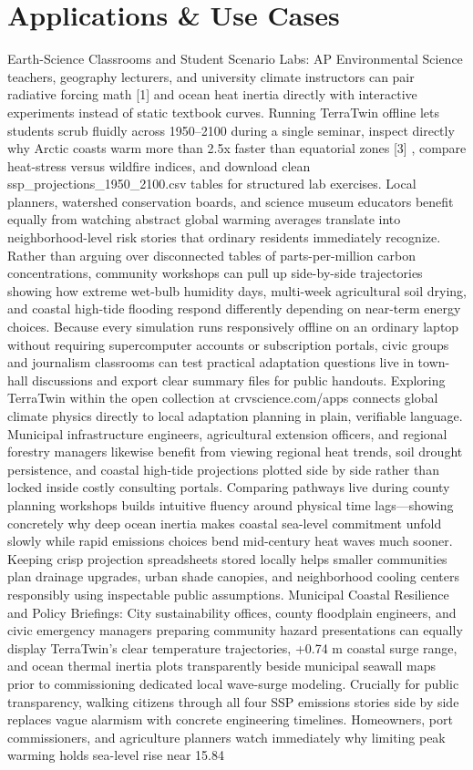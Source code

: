 \documentclass[10pt,letterpaper]{article}
\begin{document}
\section{Applications \& Use Cases}
Earth-Science Classrooms and Student Scenario Labs: AP Environmental Science teachers, geography lecturers, and university climate instructors can pair radiative forcing math [1] and ocean heat inertia directly with interactive experiments instead of static textbook curves. Running TerraTwin offline lets students scrub fluidly across 1950--2100 during a single seminar, inspect directly why Arctic coasts warm more than 2.5x faster than equatorial zones [3] , compare heat-stress versus wildfire indices, and download clean ssp\_projections\_1950\_2100.csv tables for structured lab exercises. Local planners, watershed conservation boards, and science museum educators benefit equally from watching abstract global warming averages translate into neighborhood-level risk stories that ordinary residents immediately recognize. Rather than arguing over disconnected tables of parts-per-million carbon concentrations, community workshops can pull up side-by-side trajectories showing how extreme wet-bulb humidity days, multi-week agricultural soil drying, and coastal high-tide flooding respond differently depending on near-term energy choices. Because every simulation runs responsively offline on an ordinary laptop without requiring supercomputer accounts or subscription portals, civic groups and journalism classrooms can test practical adaptation questions live in town-hall discussions and export clear summary files for public handouts. Exploring TerraTwin within the open collection at crvscience.com/apps connects global climate physics directly to local adaptation planning in plain, verifiable language. Municipal infrastructure engineers, agricultural extension officers, and regional forestry managers likewise benefit from viewing regional heat trends, soil drought persistence, and coastal high-tide projections plotted side by side rather than locked inside costly consulting portals. Comparing pathways live during county planning workshops builds intuitive fluency around physical time lags---showing concretely why deep ocean inertia makes coastal sea-level commitment unfold slowly while rapid emissions choices bend mid-century heat waves much sooner. Keeping crisp projection spreadsheets stored locally helps smaller communities plan drainage upgrades, urban shade canopies, and neighborhood cooling centers responsibly using inspectable public assumptions. Municipal Coastal Resilience and Policy Briefings: City sustainability offices, county floodplain engineers, and civic emergency managers preparing community hazard presentations can equally display TerraTwin's clear temperature trajectories, +0.74 m coastal surge range, and ocean thermal inertia plots transparently beside municipal seawall maps prior to commissioning dedicated local wave-surge modeling. Crucially for public transparency, walking citizens through all four SSP emissions stories side by side replaces vague alarmism with concrete engineering timelines. Homeowners, port commissioners, and agriculture planners watch immediately why limiting peak warming holds sea-level rise near 15.84 
\end{document}
